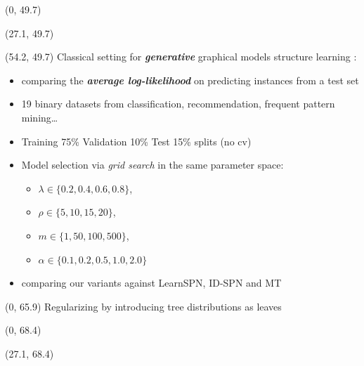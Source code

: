 \documentclass[final]{beamer}
\begin{document}
\begin{frame}{}
  \begin{textblock}{25.7}(0, 49.7)
    \small
    \blindtext
  \end{textblock}
  
  \begin{textblock}{25.7}(27.1, 49.7)
    \small
    \blindtext
  \end{textblock}
  
  
  \begin{textblock}{25.7}(54.2, 49.7)
    \footnotesize
    Classical setting for \emph{\textbf{generative}} graphical models
    structure learning \parencite{Gens2013}:
    \begin{itemize}
      \itemsep 7pt
    \item comparing the \emph{\textbf{average log-likelihood}} on predicting instances from a test set
    \item 19 binary datasets from classification, recommendation,
      frequent pattern mining\dots \parencite{Lowd2010} \parencite{Haaren2012}
    \item Training 75\% Validation 10\% Test 15\%  splits (no cv)
    \item Model selection via \textit{grid search} in the same parameter space:
      \begin{itemize}
        \footnotesize
      \item $\lambda \in \{0.2, 0.4, 0.6, 0.8\}$,
      \item $\rho \in \{5, 10, 15, 20\}$, 
      \item $m \in \{1, 50, 100, 500\}$, 
      \item $\alpha \in \{ 0.1, 0.2, 0.5, 1.0, 2.0\}$
      \end{itemize}
    \item comparing our variants against \textsf{LearnSPN},
      \textsf{ID-SPN} and \textsf{MT}~\parencite{Meila2000}
    \end{itemize}  \end{textblock}
  
  
  \begin{textblock}{80}(0, 65.9)
    Regularizing by introducing tree distributions as leaves
  \end{textblock}
  
  \begin{textblock}{25.7}(0, 68.4)
    \small
    \blindtext
  \end{textblock}
  
  \begin{textblock}{25.7}(27.1, 68.4)
    \small
    \blindtext
  \end{textblock}
  

\end{frame}
\end{document}
